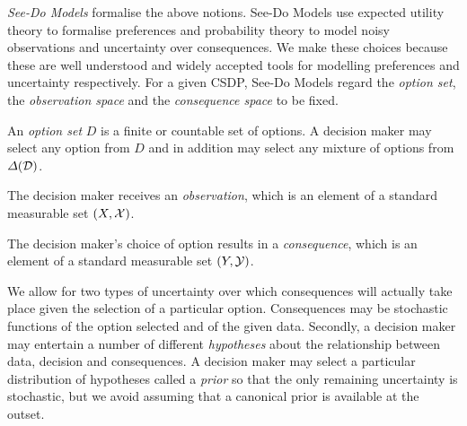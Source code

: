 \emph{See-Do Models} formalise the above notions. See-Do Models use expected utility theory to formalise preferences and probability theory to model noisy observations and uncertainty over consequences. We make these choices because these are well understood and widely accepted tools for modelling preferences and uncertainty respectively. For a given CSDP, See-Do Models regard the \emph{option set}, the \emph{observation space} and the \emph{consequence space} to be fixed.

\begin{definition}
An \emph{option set} $D$ is a finite or countable set of options. A decision maker may select any option from $D$ and in addition may select any mixture of options from $\Delta(\mathcal{D})$.
\end{definition}

\begin{definition}
The decision maker receives an \emph{observation}, which is an element of a standard measurable set $(X,\mathcal{X})$.
\end{definition}

\begin{definition}
The decision maker's choice of option results in a \emph{consequence}, which is an element of a standard measurable set $(Y,\mathcal{Y})$.
\end{definition}

We allow for two types of uncertainty over which consequences will actually take place given the selection of a particular option. Consequences may be stochastic functions of the option selected and of the given data. Secondly, a decision maker may entertain a number of different \emph{hypotheses} about the relationship between data, decision and consequences. A decision maker may select a particular distribution of hypotheses called a \emph{prior} so that the only remaining uncertainty is stochastic, but we avoid assuming that a canonical prior is available at the outset.

